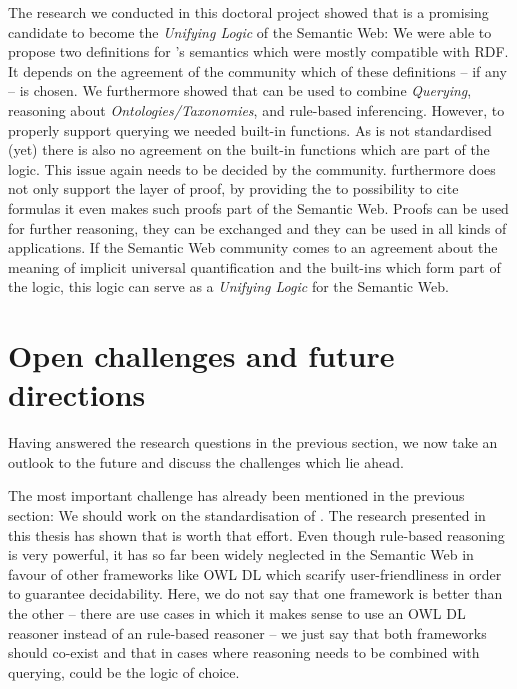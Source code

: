 The research we conducted in this doctoral project showed that \nthreelogic is a promising candidate to become the \emph{Unifying Logic} of the Semantic Web:
We were able to propose two definitions for \nthree's semantics which were mostly compatible with RDF. It depends on the agreement of the community which 
of these definitions -- if any -- is chosen.
We furthermore showed that \nthree can be used to combine \emph{Querying}, reasoning about \emph{Ontologies/Taxonomies}, and rule-based inferencing. 
However, to properly support querying we  needed 
built-in functions. As \nthree is not standardised (yet) there is also no agreement on the built-in functions which are part of the logic. This  issue again 
needs to be decided by the community. 
\nthree  furthermore does not only support the layer of proof, by providing the to possibility to cite formulas it even makes such proofs part of the Semantic Web.
Proofs can be used for further reasoning, they can be exchanged and they can be used in all kinds of applications.
If the Semantic Web community comes to an agreement about the meaning of implicit universal quantification and the built-ins which form part of the logic, this logic 
can serve as a \emph{Unifying Logic} for the Semantic Web.




\section{Open challenges and future directions}
Having answered the research questions in the previous section, we now take an outlook to the future and discuss the challenges which lie ahead. 

The most important challenge 
has already been mentioned in the previous section: We should work on the standardisation of \nthree.
The research presented in this thesis has shown that \nthree is worth that effort. 
Even though rule-based reasoning is very powerful, it has so far been widely neglected in the Semantic Web in favour of other frameworks like OWL DL which 
scarify user-friendliness in order to guarantee decidability. %
Here, we do not say that one framework is better than the other -- there are use cases in which it makes sense to use an OWL DL reasoner instead of an 
rule-based reasoner -- we just say that both frameworks should co-exist and that in cases where reasoning needs to be combined with querying, \nthree could be 
the logic of choice. 

